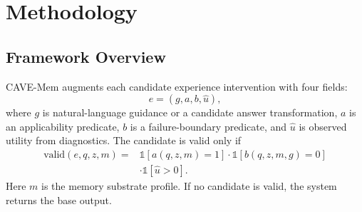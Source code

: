 \documentclass[conference]{IEEEtran}
\newcommand{\method}{CAVE-Mem}
\newcommand{\valid}{\mathrm{valid}}
\begin{document}
\section{Methodology}

\subsection{Framework Overview}
\method{} augments each candidate experience intervention with four fields:
\begin{equation}
e=(g,a,b,\hat{u}),
\end{equation}
where $g$ is natural-language guidance or a candidate answer transformation,
$a$ is an applicability predicate, $b$ is a failure-boundary predicate, and
$\hat{u}$ is observed utility from diagnostics. The candidate is valid only if
\begin{equation}
\begin{aligned}
\valid(e,q,z,m)=&
\mathbb{1}[a(q,z,m)=1]\cdot \mathbb{1}[b(q,z,m,g)=0]\\
&\cdot \mathbb{1}[\hat{u}>0].
\end{aligned}
\end{equation}
Here $m$ is the memory substrate profile. If no candidate is valid, the system
returns the base output.
\end{document}
